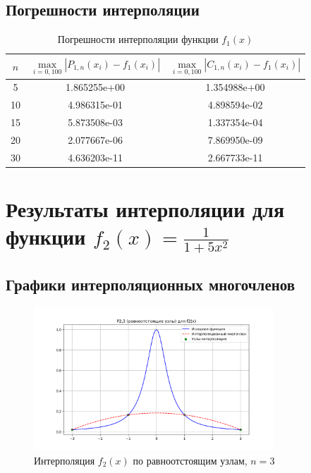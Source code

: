 \documentclass[12pt]{article}
\begin{document}
\subsection{Погрешности интерполяции}

\begin{table}[H]
    \centering
    \begin{tabular}{|c|c|c|}
        \hline
        $n$ & $\max\limits_{i=0,100} |P_{1,n}(x_i) - f_1(x_i)|$ & $\max\limits_{i=0,100} |C_{1,n}(x_i) - f_1(x_i)|$ \\
        \hline
        5 & 1.865255e+00 & 1.354988e+00 \\
        \hline
        10 & 4.986315e-01 & 4.898594e-02 \\
        \hline
        15 & 5.873508e-03 & 1.337354e-04 \\
        \hline
        20 & 2.077667e-06 & 7.869950e-09 \\
        \hline
        30 & 4.636203e-11 & 2.667733e-11 \\
        \hline
    \end{tabular}
    \caption{Погрешности интерполяции функции $f_1(x)$}
\end{table}

\section{Результаты интерполяции для функции $f_2(x) = \frac{1}{1 + 5x^2}$}

\subsection{Графики интерполяционных многочленов}

\begin{figure}[H]
    \centering
    \includegraphics[width=0.8\textwidth]{P2_3.png}
    \caption{Интерполяция $f_2(x)$ по равноотстоящим узлам, $n=3$}
\end{figure}
\end{document}
